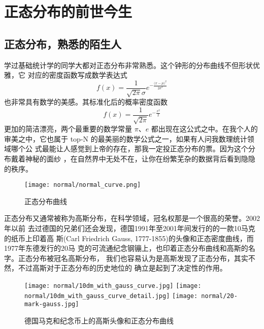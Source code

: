 %
\chapter{正态分布的前世今生}
\label{chap:history-of-normal-distribution}

\begin{verse}
\end{verse}

\section{正态分布，熟悉的陌生人}

学过基础统计学的同学大都对正态分布非常熟悉。这个钟形的分布曲线不但形状优雅，它
对应的密度函数写成数学表达式
$$ \displaystyle f(x)=\frac{1}{\sqrt{2\pi}\sigma}e^{-\frac{{(x-\mu})^2}{2\sigma^2}} $$
也非常具有数学的美感。其标准化后的概率密度函数
$$ \displaystyle f(x)=\frac{1}{\sqrt{2\pi}}e^{-\frac{x^2}{2}} $$
更加的简洁漂亮，两个最重要的数学常量 $\pi$、$e$ 都出现在这公式之中。在我个人的
审美之中，它也属于 top-N 的最美丽的数学公式之一，如果有人问我数理统计领域哪个公
式最能让人感觉到上帝的存在，那我一定投正态分布的票。因为这个分布戴着神秘的面纱
，在自然界中无处不在，让你在纷繁芜杂的数据背后看到隐隐的秩序。

\begin{figure}[H]
\centering
\texttt{[image: normal/normal\_curve.png]}
\caption{正态分布曲线}
\end{figure}

正态分布又通常被称为高斯分布，在科学领域，冠名权那是一个很高的荣誉。2002年以前
去过德国的兄弟们还会发现，德国1991年至2001年间发行的的一款10马克的纸币上印着高
斯(Carl Friedrich Gauss, 1777-1855)的头像和正态密度曲线，而1977年东德发行的20马
克的可流通纪念钢镚上，也印着正态分布曲线和高斯的名字。正态分布被冠名高斯分布，
我们也容易认为是高斯发现了正态分布，其实不然，不过高斯对于正态分布的历史地位的
确立是起到了决定性的作用。

\begin{figure}[htbp]
\centering
\texttt{[image: normal/10dm\_with\_gauss\_curve.jpg]}
\texttt{[image: normal/10dm\_with\_gauss\_curve\_detail.jpg]}
\texttt{[image: normal/20-mark-gauss.jpg]}
\caption{德国马克和纪念币上的高斯头像和正态分布曲线}
\end{figure}

